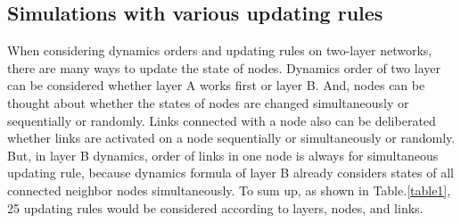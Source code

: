 \documentclass[review]{elsarticle}
\begin{document}
\subsection{Simulations with various updating rules}
When considering dynamics orders and updating rules on two-layer networks, there are many ways to update the state of nodes. Dynamics order of two layer can be considered whether layer A works first or layer B. And, nodes can be thought about whether the states of nodes are changed simultaneously or sequentially or randomly. Links connected with a node also can be deliberated whether links are activated on a node sequentially or simultaneously or randomly. But, in layer B dynamics, order of links in one node is always for simultaneous updating rule, because dynamics formula of layer B already considers states of all connected neighbor nodes simultaneously. To sum up, as shown in Table.\ref{table1}, 25 updating rules would be considered according to layers, nodes, and links. 
\end{document}
